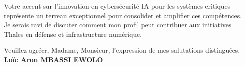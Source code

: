 \documentclass[a4paper,11pt]{article}
\begin{document}
\vspace{0.8em}
\noindent Votre accent sur l'innovation en cybersécurité IA pour les systèmes critiques représente un terreau exceptionnel pour consolider et amplifier ces compétences. Je serais ravi de discuter comment mon profil peut contribuer aux initiatives Thales en défense et infrastructure numérique.

\vspace{1.5em}
\noindent Veuillez agr\'eer, Madame, Monsieur, l'expression de mes salutations distingu\'ees.
\vspace{2em}
\noindent \textbf{Lo\"ic Aron MBASSI EWOLO}
\end{document}
